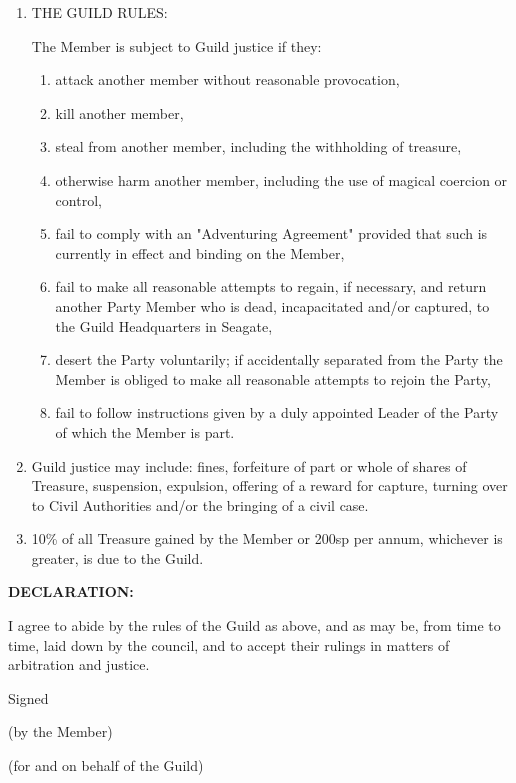 {\begin{enumerate}
\item    THE GUILD RULES:

The Member is subject to Guild justice if they:

\begin{enumerate}
\item  attack another member without reasonable provocation,
\item  kill another member,
\item  steal from another member, including the withholding of treasure,
\item  otherwise harm another member, including the use of magical coercion or control,
\item fail to comply with an "Adventuring Agreement" provided that such is
currently in effect and binding on the Member,
\item fail to make all reasonable attempts to regain, if necessary, and
return another Party Member who is dead, incapacitated and/or
captured, to the Guild Headquarters in Seagate,
\item  desert the Party voluntarily; if accidentally separated from the
Party the Member is obliged to make all reasonable attempts to rejoin
the Party,
\item  fail to follow instructions given by a duly appointed Leader of
the Party of which the Member is part.
\end{enumerate}
\item Guild justice may include: fines, forfeiture of part or whole of
shares of Treasure, suspension, expulsion, offering of a reward for
capture, turning over to Civil Authorities and/or the bringing of a
civil case.
\item 10\% of all Treasure gained by the Member or 200sp per annum,
whichever is greater, is due to the Guild.
\end{enumerate}
\vspace{5mm}

{\bfseries
DECLARATION:
\vspace{5mm}

I agree to abide by the rules of the Guild as above, and as may be,
from time to time, laid down by the council, and to accept their
rulings in matters of arbitration and justice.}

\vspace{5mm}

Signed

\vspace{15mm}

(by the Member)


\vspace{5mm}

(for and on behalf of the Guild)
}

\pagebreak

